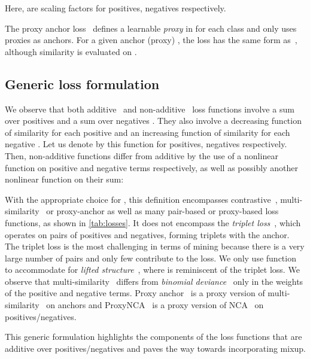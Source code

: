 \documentclass{article}
\makeatletter
\renewcommand\paragraph{\@startsection{paragraph}{4}{\z@}{1ex}{-1em}{\normalfont\normalsize\bfseries}}
\makeatother
\begin{document}
Here,  are scaling factors for positives, negatives respectively.

\paragraph{Proxy Anchor}

The proxy anchor loss~\citep{kim2020proxy} defines a learnable \emph{proxy} in  for each class and only uses proxies as anchors. For a given anchor (proxy) , the loss has the same form as~, although similarity  is evaluated on .



\subsection{Generic loss formulation}
\label{sec:frame}

We observe that both additive~ and non-additive~ loss functions involve a sum over positives  and a sum over negatives . They also involve a decreasing function of similarity  for each positive  and an increasing function of similarity  for each negative . Let us denote by  this function for positives, negatives respectively. Then, non-additive functions differ from additive by the use of a nonlinear function  on positive and negative terms respectively, as well as possibly another nonlinear function  on their sum:

With the appropriate choice for , this definition encompasses contrastive~, multi-similarity~ or proxy-anchor as well as many pair-based or proxy-based loss functions, as shown in \autoref{tab:losses}. It does not encompass the \emph{triplet loss}~\citep{WSL+14}, which operates on pairs of positives and negatives, forming triplets with the anchor. The triplet loss is the most challenging in terms of mining because there is a very large number of pairs and only few contribute to the loss. We only use function  to accommodate for \emph{lifted structure}~\citep{oh2016deep,hermans2017defense}, where  is reminiscent of the triplet loss. We observe that multi-similarity~\citep{wang2019multi} differs from \emph{binomial deviance}~\citep{deviance} only in the weights of the positive and negative terms. Proxy anchor~\citep{kim2020proxy} is a proxy version of multi-similarity~\citep{wang2019multi} on anchors and ProxyNCA~\citep{movshovitz2017no} is a proxy version of NCA~\citep{GRHS05} on positives/negatives.

This generic formulation highlights the components of the loss functions that are additive over positives/negatives and paves the way towards incorporating mixup.
\end{document}
